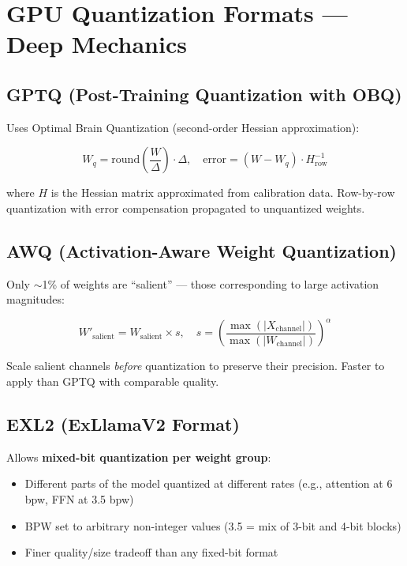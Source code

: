 \documentclass[11pt,a4paper]{article}
\begin{document}
\section{GPU Quantization Formats --- Deep Mechanics}

\subsection{GPTQ (Post-Training Quantization with OBQ)}

Uses Optimal Brain Quantization (second-order Hessian approximation):

$$W_q = \text{round}\!\left(\frac{W}{\Delta}\right) \cdot \Delta, \quad \text{error} = (W - W_q) \cdot H_{\text{row}}^{-1}$$

where $H$ is the Hessian matrix approximated from calibration data. Row-by-row quantization with error compensation propagated to unquantized weights.

\subsection{AWQ (Activation-Aware Weight Quantization)}

Only $\sim$1\% of weights are ``salient'' --- those corresponding to large activation magnitudes:

$$W'_{\text{salient}} = W_{\text{salient}} \times s, \quad s = \left(\frac{\max(|X_{\text{channel}}|)}{\max(|W_{\text{channel}}|)}\right)^\alpha$$

Scale salient channels \textit{before} quantization to preserve their precision. Faster to apply than GPTQ with comparable quality.

\subsection{EXL2 (ExLlamaV2 Format)}

Allows \textbf{mixed-bit quantization per weight group}:

\begin{itemize}[itemsep=1pt]
  \item Different parts of the model quantized at different rates (e.g., attention at 6 bpw, FFN at 3.5 bpw)
  \item BPW set to arbitrary non-integer values (3.5 = mix of 3-bit and 4-bit blocks)
  \item Finer quality/size tradeoff than any fixed-bit format
\end{itemize}
\end{document}
